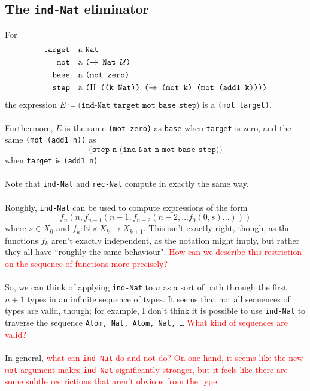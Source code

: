 \documentclass{article}
\newcommand{\ttt}[1]{\texttt{#1}}
\newcommand{\bb}[1]{\mathbb{#1}}
\newcommand{\bN}{\bb{N}}
\begin{document}
\subsection{The \ttt{ind-Nat} eliminator}
For
\begin{align*}
    \ttt{target} &\quad \text{a \ttt{Nat}} \\
    \ttt{mot} &\quad \text{a \ttt{(\(\to\) Nat \(\mathcal{U}\))}} \\
    \ttt{base} &\quad \text{a \ttt{(mot zero)}} \\
    \ttt{step} &\quad \text{a \ttt{(\(\Pi\) ((k Nat)) (\(\to\) (mot k) (mot (add1 k))))}}
\end{align*}
the expression \(E \coloneqq \ttt{(ind-Nat target mot base step)}\) is a \ttt{(mot target)}.
\\ \\
Furthermore, \(E\) is the same \ttt{(mot zero)} as \ttt{base} when \ttt{target} is zero, and the same \ttt{(mot (add1 n))} as \[
    \ttt{(step n (ind-Nat n mot base step))}
\] when \ttt{target} is \ttt{(add1 n)}.
\\ \\
Note that \ttt{ind-Nat} and \ttt{rec-Nat} compute in exactly the same way.
\\ \\
Roughly, \ttt{ind-Nat} can be used to compute expressions of the form \[
    f_n(n, f_{n - 1}(n-1, f_{n-2}(n - 2, \dots f_0(0, s)\dots)))
\] where \(s \in X_0\) and \(f_k : \bN \times X_k \to X_{k + 1}\). This isn't exactly right, though, as the functions \(f_k\) aren't exactly independent, as the notation might imply, but rather they all have ``roughly the same behaviour". \textcolor{red}{How can we describe this restriction on the sequence of functions more precisely?}
\\ \\
So, we can think of applying \ttt{ind-Nat} to \(n\) as a sort of path through the first \(n + 1\) types in an infinite sequence of types. It seems that not all sequences of types are valid, though; for example, I don't think it is possible to use \ttt{ind-Nat} to traverse the sequence \ttt{Atom, Nat, Atom, Nat, \dots} \textcolor{red}{What kind of sequences are valid?}
\\ \\
In general, \textcolor{red}{what can \ttt{ind-Nat} do and not do? On one hand, it seems like the new \ttt{mot} argument makes \ttt{ind-Nat} significantly stronger, but it feels like there are some subtle restrictions that aren't obvious from the type}.
\end{document}
